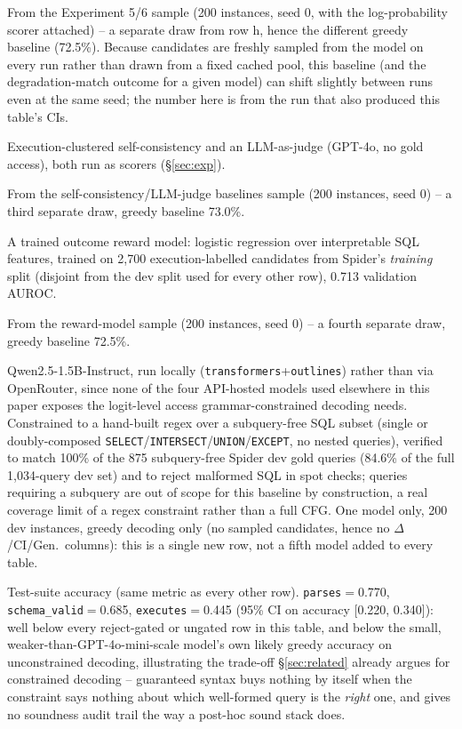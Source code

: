 \documentclass[11pt]{article}
\begin{document}
\begin{table}[t]
\begin{threeparttable}
\begin{tablenotes}[flushleft]
\item[i] From the Experiment 5/6 sample (200 instances, seed 0, with the log-probability scorer attached) -- a separate draw from row h, hence the different greedy baseline (72.5\%). Because candidates are freshly sampled from the model on every run rather than drawn from a fixed cached pool, this baseline (and the degradation-match outcome for a given model) can shift slightly between runs even at the same seed; the number here is from the run that also produced this table's CIs.
\item[j] Execution-clustered self-consistency and an LLM-as-judge (GPT-4o, no gold access), both run as scorers (\S\ref{sec:exp}).
\item[k] From the self-consistency/LLM-judge baselines sample (200 instances, seed 0) -- a third separate draw, greedy baseline 73.0\%.
\item[l] A trained outcome reward model: logistic regression over interpretable SQL features, trained on 2{,}700 execution-labelled candidates from Spider's \emph{training} split (disjoint from the dev split used for every other row), 0.713 validation AUROC.
\item[m] From the reward-model sample (200 instances, seed 0) -- a fourth separate draw, greedy baseline 72.5\%.
\item[n] Qwen2.5-1.5B-Instruct, run locally (\texttt{transformers}+\texttt{outlines}) rather than via OpenRouter, since none of the four API-hosted models used elsewhere in this paper exposes the logit-level access grammar-constrained decoding needs. Constrained to a hand-built regex over a subquery-free SQL subset (single or doubly-composed \texttt{SELECT}/\texttt{INTERSECT}/\texttt{UNION}/\texttt{EXCEPT}, no nested queries), verified to match 100\% of the 875 subquery-free Spider dev gold queries (84.6\% of the full 1{,}034-query dev set) and to reject malformed SQL in spot checks; queries requiring a subquery are out of scope for this baseline by construction, a real coverage limit of a regex constraint rather than a full CFG. One model only, 200 dev instances, greedy decoding only (no sampled candidates, hence no $\Delta$/CI/Gen.\ columns): this is a single new row, not a fifth model added to every table.
\item[o] Test-suite accuracy (same metric as every other row). \texttt{parses}$=$0.770, \texttt{schema\_valid}$=$0.685, \texttt{executes}$=$0.445 (95\% CI on accuracy [0.220, 0.340]): well below every reject-gated or ungated row in this table, and below the small, weaker-than-GPT-4o-mini-scale model's own likely greedy accuracy on unconstrained decoding, illustrating the trade-off \S\ref{sec:related} already argues for constrained decoding -- guaranteed syntax buys nothing by itself when the constraint says nothing about which well-formed query is the \emph{right} one, and gives no soundness audit trail the way a post-hoc sound stack does.
\end{tablenotes}
\end{threeparttable}
\caption*{\textbf{SQL, GPT-4o} (Spider dev split; sound stack $=$ \texttt{parses}$\wedge$\texttt{schema\_valid}$\wedge$\texttt{executes}).}


\end{table}
\end{document}

